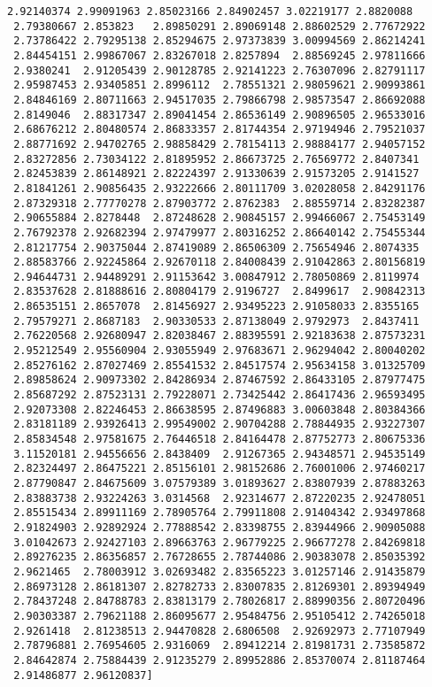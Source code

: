 \documentclass[11pt]{article}
\begin{document}
\begin{Verbatim}[commandchars=\\\{\}]
 2.92140374 2.99091963 2.85023166 2.84902457 3.02219177 2.8820088
 2.79380667 2.853823   2.89850291 2.89069148 2.88602529 2.77672922
 2.73786422 2.79295138 2.85294675 2.97373839 3.00994569 2.86214241
 2.84454151 2.99867067 2.83267018 2.8257894  2.88569245 2.97811666
 2.9380241  2.91205439 2.90128785 2.92141223 2.76307096 2.82791117
 2.95987453 2.93405851 2.8996112  2.78551321 2.98059621 2.90993861
 2.84846169 2.80711663 2.94517035 2.79866798 2.98573547 2.86692088
 2.8149046  2.88317347 2.89041454 2.86536149 2.90896505 2.96533016
 2.68676212 2.80480574 2.86833357 2.81744354 2.97194946 2.79521037
 2.88771692 2.94702765 2.98858429 2.78154113 2.98884177 2.94057152
 2.83272856 2.73034122 2.81895952 2.86673725 2.76569772 2.8407341
 2.82453839 2.86148921 2.82224397 2.91330639 2.91573205 2.9141527
 2.81841261 2.90856435 2.93222666 2.80111709 3.02028058 2.84291176
 2.87329318 2.77770278 2.87903772 2.8762383  2.88559714 2.83282387
 2.90655884 2.8278448  2.87248628 2.90845157 2.99466067 2.75453149
 2.76792378 2.92682394 2.97479977 2.80316252 2.86640142 2.75455344
 2.81217754 2.90375044 2.87419089 2.86506309 2.75654946 2.8074335
 2.88583766 2.92245864 2.92670118 2.84008439 2.91042863 2.80156819
 2.94644731 2.94489291 2.91153642 3.00847912 2.78050869 2.8119974
 2.83537628 2.81888616 2.80804179 2.9196727  2.8499617  2.90842313
 2.86535151 2.8657078  2.81456927 2.93495223 2.91058033 2.8355165
 2.79579271 2.8687183  2.90330533 2.87138049 2.9792973  2.8437411
 2.76220568 2.92680947 2.82038467 2.88395591 2.92183638 2.87573231
 2.95212549 2.95560904 2.93055949 2.97683671 2.96294042 2.80040202
 2.85276162 2.87027469 2.85541532 2.84517574 2.95634158 3.01325709
 2.89858624 2.90973302 2.84286934 2.87467592 2.86433105 2.87977475
 2.85687292 2.87523131 2.79228071 2.73425442 2.86417436 2.96593495
 2.92073308 2.82246453 2.86638595 2.87496883 3.00603848 2.80384366
 2.83181189 2.93926413 2.99549002 2.90704288 2.78844935 2.93227307
 2.85834548 2.97581675 2.76446518 2.84164478 2.87752773 2.80675336
 3.11520181 2.94556656 2.8438409  2.91267365 2.94348571 2.94535149
 2.82324497 2.86475221 2.85156101 2.98152686 2.76001006 2.97460217
 2.87790847 2.84675609 3.07579389 3.01893627 2.83807939 2.87883263
 2.83883738 2.93224263 3.0314568  2.92314677 2.87220235 2.92478051
 2.85515434 2.89911169 2.78905764 2.79911808 2.91404342 2.93497868
 2.91824903 2.92892924 2.77888542 2.83398755 2.83944966 2.90905088
 3.01042673 2.92427103 2.89663763 2.96779225 2.96677278 2.84269818
 2.89276235 2.86356857 2.76728655 2.78744086 2.90383078 2.85035392
 2.9621465  2.78003912 3.02693482 2.83565223 3.01257146 2.91435879
 2.86973128 2.86181307 2.82782733 2.83007835 2.81269301 2.89394949
 2.78437248 2.84788783 2.83813179 2.78026817 2.88990356 2.80720496
 2.90303387 2.79621188 2.86095677 2.95484756 2.95105412 2.74265018
 2.9261418  2.81238513 2.94470828 2.6806508  2.92692973 2.77107949
 2.78796881 2.76954605 2.9316069  2.89412214 2.81981731 2.73585872
 2.84642874 2.75884439 2.91235279 2.89952886 2.85370074 2.81187464
 2.91486877 2.96120837]
    \end{Verbatim}
\end{document}
